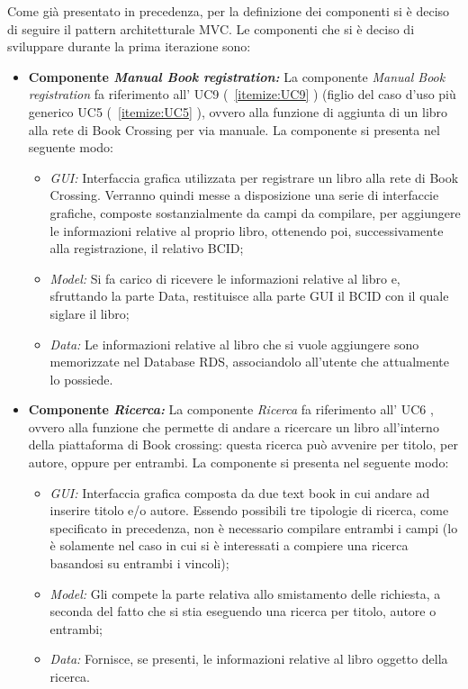 Come già presentato in precedenza, per la definizione dei componenti si è deciso di seguire il pattern architetturale MVC. 
Le componenti che si è deciso di sviluppare durante la prima iterazione sono: 
\begin{itemize}
	\item \textbf{Componente \textit{Manual Book registration:}} La componente \textit{Manual Book registration} fa riferimento all’ UC9 (~\ref{itemize:UC9} ) (figlio del caso d'uso più generico UC5 (~\ref{itemize:UC5} ), ovvero alla funzione di aggiunta di un libro alla rete di Book Crossing per via manuale. La componente si presenta nel seguente modo:
	\begin{itemize}
		\item \textit{GUI:} Interfaccia grafica utilizzata per registrare un libro alla rete di Book Crossing. Verranno quindi messe a disposizione una serie di interfaccie grafiche, composte sostanzialmente da campi da compilare, per aggiungere le informazioni relative al proprio libro, ottenendo poi, successivamente alla registrazione, il relativo BCID;
		\item \textit{Model:} Si fa carico di ricevere le informazioni relative al libro e, sfruttando la parte Data, restituisce alla parte GUI il BCID con il quale siglare il libro;
		\item \textit{Data:} Le informazioni relative al libro che si vuole aggiungere sono memorizzate nel Database RDS, associandolo all'utente che attualmente lo possiede. 
	\end{itemize}
	\item \textbf{Componente \textit{Ricerca:}}  La componente \textit{Ricerca} fa riferimento all’ UC6 
	, ovvero alla funzione che permette di andare a ricercare un libro all'interno della piattaforma di Book crossing: questa ricerca può avvenire per titolo, per autore, oppure per entrambi. La componente si presenta nel seguente modo:
	\begin{itemize}
		\item \textit{GUI:} Interfaccia grafica composta da due text book in cui andare ad inserire titolo e/o autore. Essendo possibili tre tipologie di ricerca, come specificato in precedenza, non è necessario compilare entrambi i campi (lo è solamente nel caso in cui si è interessati a compiere una ricerca basandosi su entrambi i vincoli);
		\item \textit{Model:} Gli compete la parte relativa allo smistamento delle richiesta, a seconda del fatto che si stia eseguendo una ricerca per titolo, autore o entrambi;
		\item \textit{Data:} Fornisce, se presenti, le informazioni relative al libro oggetto della ricerca.
	\end{itemize}
\end{itemize}